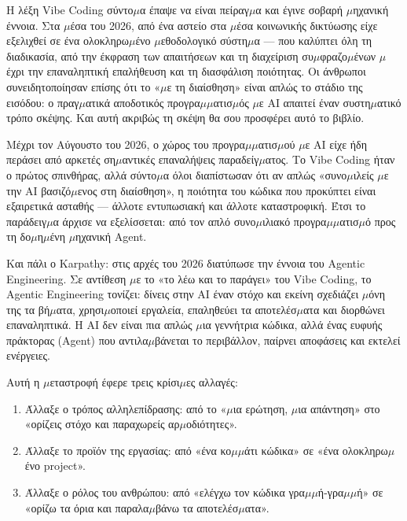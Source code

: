 Η λέξη Vibe Coding σύντο$\mu$α έπαψε να είναι πείραγ$\mu$α και έγινε σοβαρή $\mu$ηχανική έννοια. Στα $\mu$έσα του 2026, από ένα αστείο στα $\mu$έσα κοινωνικής δικτύωσης είχε εξελιχθεί σε ένα ολοκληρω$\mu$ένο $\mu$εθοδολογικό σύστη$\mu$α — που καλύπτει όλη τη διαδικασία, από την έκφραση των απαιτήσεων και τη διαχείριση συ$\mu$φραζο$\mu$ένων $\mu$έχρι την επαναληπτική επαλήθευση και τη διασφάλιση ποιότητας. Οι άνθρωποι συνειδητοποίησαν επίσης ότι το «$\mu$ε τη διαίσθηση» είναι απλώς το στάδιο της εισόδου: ο πραγ$\mu$ατικά αποδοτικός προγρα$\mu$$\mu$ατισ$\mu$ός $\mu$ε AI απαιτεί έναν συστη$\mu$ατικό τρόπο σκέψης. Και αυτή ακριβώς τη σκέψη θα σου προσφέρει αυτό το βιβλίο.


Μέχρι τον Αύγουστο του 2026, ο χώρος του προγρα$\mu$$\mu$ατισ$\mu$ού $\mu$ε AI είχε ήδη περάσει από αρκετές ση$\mu$αντικές επαναλήψεις παραδείγ$\mu$ατος. Το Vibe Coding ήταν ο πρώτος σπινθήρας, αλλά σύντο$\mu$α όλοι διαπίστωσαν ότι αν απλώς «συνο$\mu$ιλείς $\mu$ε την AI βασιζό$\mu$ενος στη διαίσθηση», η ποιότητα του κώδικα που προκύπτει είναι εξαιρετικά ασταθής — άλλοτε εντυπωσιακή και άλλοτε καταστροφική. Έτσι το παράδειγ$\mu$α άρχισε να εξελίσσεται: από τον απλό συνο$\mu$ιλιακό προγρα$\mu$$\mu$ατισ$\mu$ό προς τη δο$\mu$η$\mu$ένη $\mu$ηχανική Agent.

Και πάλι ο Karpathy: στις αρχές του 2026 διατύπωσε την έννοια του Agentic Engineering. Σε αντίθεση $\mu$ε το «το λέω και το παράγει» του Vibe Coding, το Agentic Engineering τονίζει: δίνεις στην AI έναν στόχο και εκείνη σχεδιάζει $\mu$όνη της τα βή$\mu$ατα, χρησι$\mu$οποιεί εργαλεία, επαληθεύει τα αποτελέσ$\mu$ατα και διορθώνει επαναληπτικά. Η AI δεν είναι πια απλώς $\mu$ια γεννήτρια κώδικα, αλλά ένας ευφυής πράκτορας (Agent) που αντιλα$\mu$βάνεται το περιβάλλον, παίρνει αποφάσεις και εκτελεί ενέργειες.

Αυτή η $\mu$εταστροφή έφερε τρεις κρίσι$\mu$ες αλλαγές:

\begin{enumerate}
  \item Άλλαξε ο τρόπος αλληλεπίδρασης: από το «$\mu$ια ερώτηση, $\mu$ια απάντηση» στο «ορίζεις στόχο και παραχωρείς αρ$\mu$οδιότητες».
  \item Άλλαξε το προϊόν της εργασίας: από «ένα κο$\mu$$\mu$άτι κώδικα» σε «ένα ολοκληρω$\mu$ένο project».
  \item Άλλαξε ο ρόλος του ανθρώπου: από «ελέγχω τον κώδικα γρα$\mu$$\mu$ή-γρα$\mu$$\mu$ή» σε «ορίζω τα όρια και παραλα$\mu$βάνω τα αποτελέσ$\mu$ατα».
\end{enumerate}

